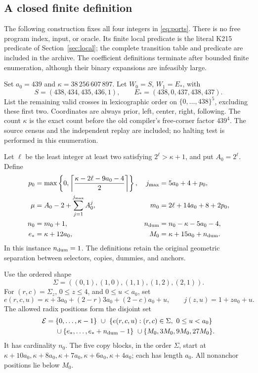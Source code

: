 \subsection{A closed finite definition}

The following construction fixes all four integers in \eqref{eq:ports}.
There is no free program index, input, or oracle. Its finite local
predicate is the literal K215 predicate of Section~\ref{sec:local};
the complete transition table and predicate are included in the archive.
The coefficient definitions terminate after bounded finite enumeration,
although their binary expansions are infeasibly large.

Set \(a_0=439\) and \(\kappa=38\,256\,607\,897\).
Let \(W_0=S\), \(W_1=E_*\), with
\[
 S=(438,434,435,436,1),\qquad
 E_*=(438,0,437,438,437).
\]
List the remaining valid crosses in lexicographic order on
\(\{0,\ldots,438\}^5\), excluding these first two.
Coordinates are always prior, left, center, right, following.
The count \(\kappa\) is the exact count before the old compiler's
free-corner factor \(439^4\). The source census and the independent
replay are included; no halting test is performed in this enumeration.

Let \(\ell\) be the least integer at least two satisfying
\(2^\ell>\kappa+1\), and put \(A_0=2^\ell\). Define
\begin{align}
 p_0&=\max\left\{0,
       \left\lceil\frac{\kappa-2\ell-9a_0-4}{2}\right\rceil\right\},
 &j_{\max}&=5a_0+4+p_0,\notag\\
 \mu&=A_0-2+\sum_{j=1}^{j_{\max}}A_0^j,
 &m_0&=2\ell+14a_0+8+2p_0,\notag\\
 n_0&=m_0+1,
 &n_{\rm dum}&=n_0-\kappa-5a_0-4,\notag\\
 e_*&=\kappa+12a_0,
 &M_0&=\kappa+15a_0+n_{\rm dum}.
 \label{eq:cross-layout}
\end{align}
In this instance \(n_{\rm dum}=1\). The definitions retain the
original geometric separation between selectors, copies, dummies,
and anchors.

Use the ordered shape
\[
 \Sigma=((0,1),(1,0),(1,1),(1,2),(2,1)).
\]
For \((r,c)=\Sigma_z\), \(0\le z\le4\), and \(0\le u<a_0\), set
\begin{equation}\label{eq:cross-copy-address}
 e(r,c,u)=\kappa+3a_0+(2-r)3a_0+(2-c)a_0+u,
 \qquad j(z,u)=1+za_0+u.
\end{equation}
The allowed radix positions form the disjoint set
\begin{align}
 \mathcal E={}&\{0,\ldots,\kappa-1\}
 \ \cup\ \{e(r,c,u):(r,c)\in\Sigma,\ 0\le u<a_0\}\notag\\
 &{}\cup\{e_*,\ldots,e_*+n_{\rm dum}-1\}
 \ \cup\{M_0,3M_0,9M_0,27M_0\}.
 \label{eq:cross-support}
\end{align}
It has cardinality \(n_0\). The five copy blocks, in the order
\(\Sigma\), start at
\(\kappa+10a_0,\kappa+8a_0,\kappa+7a_0,\kappa+6a_0,\kappa+4a_0\);
each has length \(a_0\). All nonanchor positions lie below \(M_0\).

